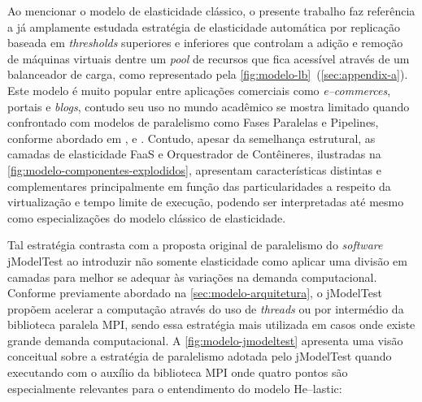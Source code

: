 \documentclass[english,brazilian]{UNISINOSmonografia} %
\begin{document}
Ao mencionar o modelo de elasticidade clássico, o presente trabalho faz referência a já amplamente estudada estratégia de elasticidade automática por replicação baseada em \textit{thresholds} superiores e inferiores que controlam a adição e remoção de máquinas virtuais dentre um \textit{pool} de recursos que fica acessível através de um balanceador de carga, como representado pela \autoref{fig:modelo-lb}~(\autoref{sec:appendix-a}).
Este modelo é muito popular entre aplicações comerciais como \textit{e--commerces}, portais e \textit{blogs}, contudo seu uso no mundo acadêmico se mostra limitado quando confrontado com modelos de paralelismo como Fases Paralelas e Pipelines, conforme abordado em ,  e .
Contudo, apesar da semelhança estrutural, as camadas de elasticidade FaaS e Orquestrador de Contêineres, ilustradas na \autoref{fig:modelo-componentes-explodidos}, apresentam características distintas e complementares principalmente em função das particularidades a respeito da virtualização e tempo limite de execução, podendo ser interpretadas até mesmo como especializações do modelo clássico de elasticidade.



Tal estratégia contrasta com a proposta original de paralelismo do \textit{software} jModelTest ao introduzir não somente elasticidade como aplicar uma divisão em camadas para melhor se adequar às variações na demanda computacional.
Conforme previamente abordado na \autoref{sec:modelo-arquitetura}, o jModelTest propõem acelerar a computação através do uso de \textit{threads} ou por intermédio da biblioteca paralela MPI, sendo essa estratégia mais utilizada em casos onde existe grande demanda computacional.
A \autoref{fig:modelo-jmodeltest} apresenta uma visão conceitual sobre a estratégia de paralelismo adotada pelo jModelTest quando executando com o auxílio da biblioteca MPI onde quatro pontos são especialmente relevantes para o entendimento do modelo \textsf{He}--lastic:
\end{document}
